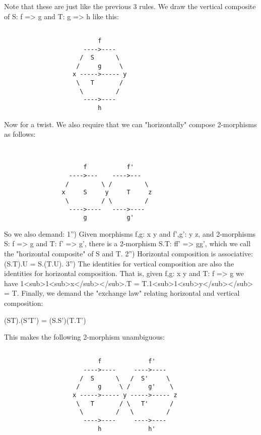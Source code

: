 Note that these are just like the previous 3 rules.  We draw the vertical
composite of S: f => g and T: g => h like this:


\begin{verbatim}

                          f
                      ---->----
                     /  S      \
                    /     g     \
                   x ----->----- y
                    \   T       /
                     \         /
                      ---->----
                          h

\end{verbatim}
    
Now for a twist.  We also require that we can "horizontally" compose
2-morphisms as follows:

\begin{verbatim}

 
                      f           f'
                  ---->---    ---->---
                 /         \ /         \
                x     S     y     T     z
                 \         / \         /
                  ---->----   ---->----
                      g           g'

\end{verbatim}
    
So we also demand:
1'') Given morphisms f,g: x \to  y and f',g': y \to  z, and 2-morphisms
S: f => g and T: f' => g', there is a 2-morphism S.T: ff' => gg', which we
call the "horizontal composite" of S and T.
2'') Horizontal composition is associative:  (S.T).U = S.(T.U).
3'') The identities for vertical composition are also the identities for
horizontal composition.  That is, given f,g: x \to  y and T: f => g we
have 1<sub>1<sub>x</sub></sub>.T = T.1<sub>1<sub>y</sub></sub> = T. 
Finally, we demand the "exchange law" relating horizontal and
vertical composition:  

                     (ST).(S'T') = (S.S')(T.T')

This makes the following 2-morphism unambiguous:


\begin{verbatim}

                          f             f'
                      ---->----     ---->----
                     /  S      \   /  S'     \
                    /     g     \ /     g'    \
                   x ----->----- y ----->----- z
                    \   T       / \   T'      /
                     \         /   \         /
                      ---->----     ---->----
                          h             h'

\end{verbatim}
    

